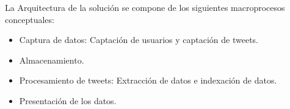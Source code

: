 La Arquitectura de la solución se compone de los siguientes macroprocesos conceptuales: 

\begin{itemize}
	\item Captura de datos: Captación de usuarios y captación de tweets.
	\item Almacenamiento.
	\item Procesamiento de tweets: Extracción de datos e indexación de datos.
	\item Presentación de los datos.
\end{itemize}

